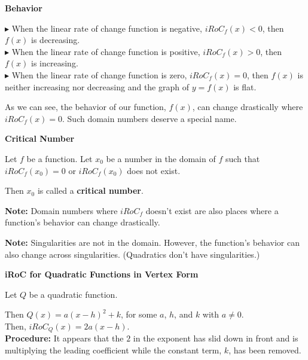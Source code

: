\documentclass{ximera}
\begin{document}
\begin{conclusion}  \textbf{\textcolor{green!50!black}{Behavior}}

$\blacktriangleright$ When the linear rate of change function is negative, $iRoC_f(x) < 0$, then $f(x)$ is decreasing. \\

$\blacktriangleright$ When the linear rate of change function is positive, $iRoC_f(x) > 0$, then $f(x)$ is increasing. \\

$\blacktriangleright$ When the linear rate of change function is zero, $iRoC_f(x) = 0$, then $f(x)$ is neither increasing nor decreasing and the graph of $y = f(x)$ is flat. 

\end{conclusion}


As we can see, the behavior of our function, $f(x)$, can change drastically where $iRoC_f(x) = 0$.  Such domain numbers deserve a special name.



\begin{definition} \textbf{\textcolor{green!50!black}{Critical Number}}  


Let $f$ be a function. Let $x_0$ be a number in the domain of $f$ such that $iRoC_f(x_0) = 0$ or $iRoC_f(x_0)$ does not exist.

Then $x_0$ is called a \textbf{critical number}.


\end{definition}

\textbf{Note: } Domain numbers where $iRoC_f$ doesn't exist are also places where a function's behavior can change drastically.

\textbf{Note: } Singularities are not in the domain. However, the function's behavior can also change across singularities. (Quadratics don't have singularities.)


\begin{procedure} \textbf{\textcolor{blue!75!black}{iRoC for Quadratic Functions in Vertex Form}} 



Let $Q$ be a quadratic function.

Then $Q(x) = a (x - h)^2 + k$, for some $a$, $h$, and $k$ with $a \ne 0$. \\

Then, $iRoC_Q(x) = 2 a (x - h)$. \\


\textbf{Procedure:} It appears that the $2$ in the exponent has slid down in front and is multiplying the leading coefficient while the constant term, $k$, has been removed.



\end{procedure}
\end{document}
